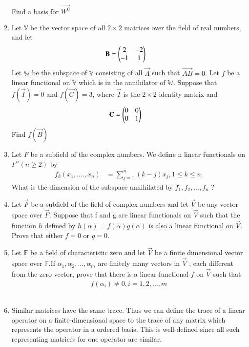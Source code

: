 \begin{enumerate}[label=\thesubsection.\arabic*.,ref=\thesubsection.\theenumi]
\begin{multline}
\begin{aligned}
    \end{aligned}
    \end{multline}
    Find a basis for $\vec{W^0}$
%
\\
\solution

\item Let $\mathbb{V}$ be the vector space of all $2 \times 2$ matrices over the field of real numbers, and let
\begin{align}
\mathbf{B} &= \begin{pmatrix}2&-2\\-1&1\end{pmatrix}
\end{align}
Let $\mathbb{W}$ be the subspace of $\mathbb{V}$ consisting of all $\vec{A}$ such that $\vec{AB} = 0$. Let $f$ be a linear functional on $\mathbb{V}$ which is in the annihilator of $\mathbb{W}$. Suppose that $f(\vec{I}) = 0$ and $f(\vec{C}) = 3$, where $\vec{I}$ is the $2 \times 2$ identity matrix and
\begin{align}
\mathbf{C} &= \begin{pmatrix}0&0\\0&1\end{pmatrix}
\end{align}
Find $f(\vec{B})$
%
\\
\solution

\item Let $F$ be a subfield of the complex numbers. We define n linear functionals on $F^n(n \ge 2)$ by
\begin{align}
    f_k(x_1,....,x_n) &= \sum_{j=1}^{n}(k-j)x_j, 
    1 \le k \le n.
\end{align}
What is the dimension of the subspace annihilated by $f_1,f_2,...,f_n$ ?
%
\\
\solution

\item Let $\vec{F}$ be a subfield of the field of complex numbers and let $\vec{V}$ be any vector space over $\vec{F}$. Suppose that f and g are linear functionals on $\vec{V}$ such that the function $h$ defined by $h(\alpha) =f(\alpha) g(\alpha)$ is also a linear functional on $\vec{V}$. Prove that either $f=0$ or $g=0$.
%
\\
\solution

\item Let $\mathbb{F}$ be a field of characteristic zero and let $\vec{V}$ be a finite dimensional vector space over  $\mathbb{F}$.If $\alpha_1,\alpha_2,\hdots,\alpha_m$ are finitely many vectors in $\vec{V}$ , each different from the zero vector, prove that there is a linear functional $f$ on $\vec{V}$ such that
\begin{align}
    f(\alpha_i) \neq 0, i=1,2,\hdots,m
\end{align}
%
\\
\solution

\item Similar matrices have the same trace. Thus we can define the trace of a linear operator on a finite-dimensional space to the trace of any matrix which represents the operator in a ordered basis. This is well-defined since all such representing matrices for one operator are similar. 


\end{enumerate}
